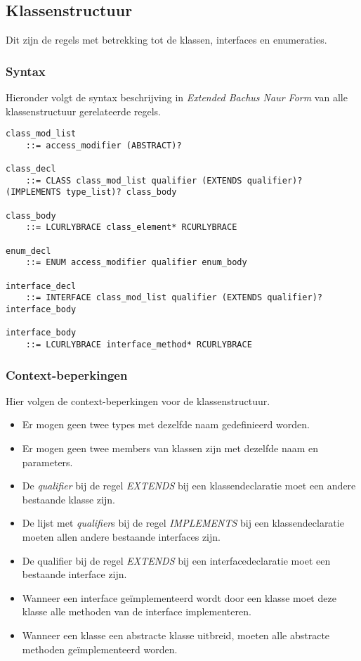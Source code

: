 \subsection{Klassenstructuur}
Dit zijn de regels met betrekking tot de klassen, interfaces en enumeraties.

\subsubsection{Syntax}
Hieronder volgt de syntax beschrijving in \textit{Extended Bachus Naur Form} van alle klassenstructuur gerelateerde regels.

\begin{lstlisting}
class_mod_list
	::=	access_modifier (ABSTRACT)?

class_decl
	::=	CLASS class_mod_list qualifier (EXTENDS qualifier)? (IMPLEMENTS type_list)? class_body

class_body
	::=	LCURLYBRACE class_element* RCURLYBRACE

enum_decl
	::=	ENUM access_modifier qualifier enum_body

interface_decl
	::=	INTERFACE class_mod_list qualifier (EXTENDS qualifier)? interface_body

interface_body
	::=	LCURLYBRACE interface_method* RCURLYBRACE
\end{lstlisting}

\subsubsection{Context-beperkingen}
Hier volgen de context-beperkingen voor de klassenstructuur.

\begin{itemize}
	\item Er mogen geen twee types met dezelfde naam gedefinieerd worden.
	\item Er mogen geen twee members van klassen zijn met dezelfde naam en parameters.
	\item De \textit{qualifier} bij de regel \textit{EXTENDS} bij een klassendeclaratie moet een andere bestaande klasse zijn.
	\item De lijst met \textit{qualifier}s bij de regel \textit{IMPLEMENTS} bij een klassendeclaratie moeten allen andere bestaande interfaces zijn.
	\item De qualifier bij de regel \textit{EXTENDS} bij een interfacedeclaratie moet een bestaande interface zijn.
	\item Wanneer een interface ge\"implementeerd wordt door een klasse moet deze klasse alle methoden van de interface implementeren.
	\item Wanneer een klasse een abstracte klasse uitbreid, moeten alle abstracte methoden ge\"implementeerd worden.
\end{itemize}

